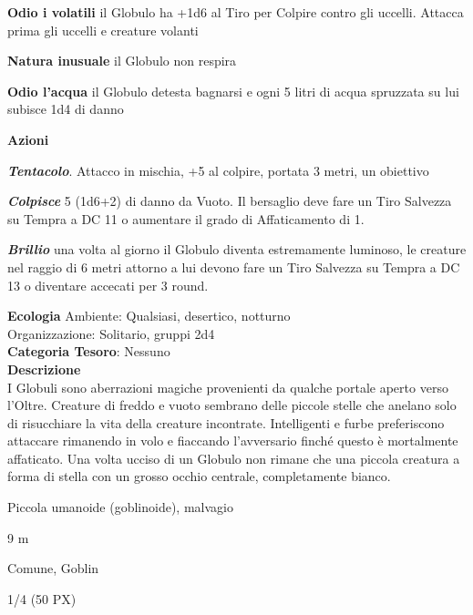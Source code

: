 \begin{multicols}{2}
{\textbf{Odio i volatili} il Globulo ha +1d6 al Tiro per Colpire contro gli uccelli. Attacca prima gli uccelli e creature volanti

\textbf{Natura inusuale} il Globulo non respira

\textbf{Odio l'acqua} il Globulo detesta bagnarsi e ogni 5 litri di acqua spruzzata su lui subisce 1d4 di danno

\textbf{Azioni}

\emph{\textbf{Tentacolo}}. Attacco in mischia, +5 al colpire, portata 3 metri, un obiettivo

\emph{\textbf{Colpisce}} 5 (1d6+2) di danno da Vuoto. Il bersaglio deve fare un Tiro Salvezza su Tempra a DC 11 o aumentare il grado di Affaticamento di 1.

\textbf{\emph{Brillio}} una volta al giorno il Globulo diventa estremamente luminoso, le creature nel raggio di 6 metri attorno a lui devono fare un Tiro Salvezza su Tempra a DC 13 o diventare accecati per 3 round.

\textbf{Ecologia}
Ambiente: Qualsiasi, desertico, notturno\\
Organizzazione: Solitario, gruppi 2d4\\
\textbf{Categoria Tesoro}: Nessuno\\
\textbf{Descrizione}\\
I Globuli sono aberrazioni magiche provenienti da qualche portale aperto verso l'Oltre. Creature di freddo e vuoto sembrano delle piccole stelle che anelano solo di risucchiare la vita della creature incontrate.
Intelligenti e furbe preferiscono attaccare rimanendo in volo e fiaccando l'avversario finché questo è mortalmente affaticato. Una volta ucciso di un Globulo non rimane che una piccola creatura a forma di stella con un grosso occhio centrale, completamente bianco.

\begin{description}[noitemsep, topsep=0pt, parsep=0pt, partopsep=0pt, itemsep=1pt, leftmargin=2.35cm,  labelwidth=2.2cm, itemindent=0cm, listparindent=0pt] %
\setlength{\baselineskip}{10pt}
\item[\textbf{Taglia/Tipo}] Piccola umanoide (goblinoide), malvagio
\item[\textbf{Caratt.}] 
\item[\textbf{Punti Ferita}] 
\item[\textbf{Movimento}] 9 m
\item[\textbf{Tiri Salvez.}] 
\item[\textbf{Sensi}] 
\item[\textbf{Linguaggi}] Comune, Goblin
\item[\textbf{Sfida}] 1/4 (50 PX)
\end{description}
\smallskip

}
\end{multicols}
